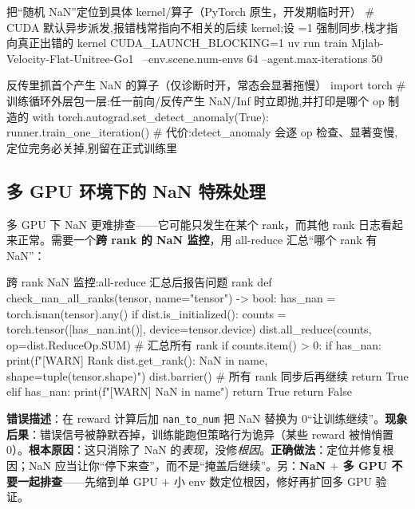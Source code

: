 \begin{codebox}[bash]{把“随机 NaN”定位到具体 kernel/算子（PyTorch 原生，开发期临时开）}
# CUDA 默认异步派发,报错栈常指向不相关的后续 kernel;设 =1 强制同步,栈才指向真正出错的 kernel
CUDA_LAUNCH_BLOCKING=1 uv run train Mjlab-Velocity-Flat-Unitree-Go1 \
    --env.scene.num-envs 64 --agent.max-iterations 50
\end{codebox}

\begin{codebox}[Python]{反传里抓首个产生 NaN 的算子（仅诊断时开，常态会显著拖慢）}
import torch
# 训练循环外层包一层:任一前向/反传产生 NaN/Inf 时立即抛,并打印是哪个 op 制造的
with torch.autograd.set_detect_anomaly(True):
    runner.train_one_iteration()
# 代价:detect_anomaly 会逐 op 检查、显著变慢,定位完务必关掉,别留在正式训练里
\end{codebox}

\subsection{多 GPU 环境下的 NaN 特殊处理}
\label{sec:rlmc-ls-nan-multigpu}

多 GPU 下 NaN 更难排查——它可能只发生在某个 rank，而其他 rank 日志看起来正常。需要一个\textbf{跨 rank 的 NaN 监控}，用 all-reduce 汇总“哪个 rank 有 NaN”：

\begin{codebox}[Python]{跨 rank NaN 监控:all-reduce 汇总后报告问题 rank}
def check_nan_all_ranks(tensor, name="tensor") -> bool:
    has_nan = torch.isnan(tensor).any()
    if dist.is_initialized():
        counts = torch.tensor([has_nan.int()], device=tensor.device)
        dist.all_reduce(counts, op=dist.ReduceOp.SUM)   # 汇总所有 rank
        if counts.item() > 0:
            if has_nan:
                print(f"[WARN] Rank {dist.get_rank()}: NaN in {name}, shape={tuple(tensor.shape)}")
            dist.barrier()                              # 所有 rank 同步后再继续
            return True
    elif has_nan:
        print(f"[WARN] NaN in {name}")
        return True
    return False
\end{codebox}

\begin{pitfall}[别用 \texttt{torch.\allowbreak nan\_to\_num()} 把 NaN 掩盖掉]
\textbf{错误描述}：在 reward 计算后加 \verb|nan_to_num| 把 NaN 替换为 0“让训练继续”。\textbf{现象后果}：错误信号被静默吞掉，训练能跑但策略行为诡异（某些 reward 被悄悄置 0）。\textbf{根本原因}：这只消除了 NaN 的\emph{表现}，没修\emph{根因}。\textbf{正确做法}：定位并修复根因；NaN 应当让你“停下来查”，而不是“掩盖后继续”。另：\textbf{NaN $+$ 多 GPU 不要一起排查}——先缩到单 GPU $+$ 小 env 数定位根因，修好再扩回多 GPU 验证。
\end{pitfall}

